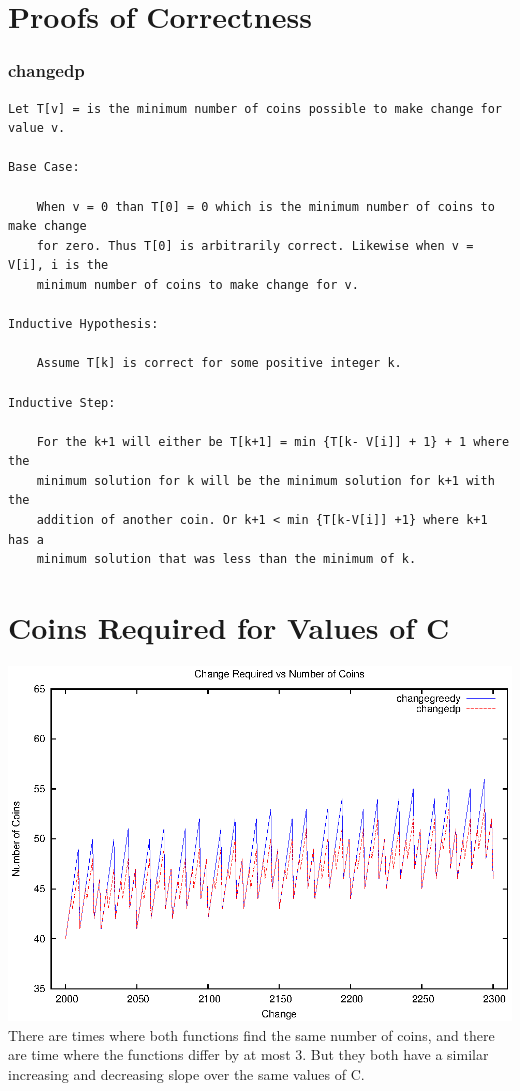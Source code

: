 \documentclass[letterpaper,10pt,titlepage]{article}
\begin{document}
\section{Proofs of Correctness}
\subsubsection{changedp}
\begin{verbatim}
Let T[v] = is the minimum number of coins possible to make change for value v.

Base Case: 

    When v = 0 than T[0] = 0 which is the minimum number of coins to make change 
    for zero. Thus T[0] is arbitrarily correct. Likewise when v = V[i], i is the
    minimum number of coins to make change for v.

Inductive Hypothesis: 

    Assume T[k] is correct for some positive integer k. 

Inductive Step:

    For the k+1 will either be T[k+1] = min {T[k- V[i]] + 1} + 1 where the
    minimum solution for k will be the minimum solution for k+1 with the
    addition of another coin. Or k+1 < min {T[k-V[i]] +1} where k+1 has a
    minimum solution that was less than the minimum of k.
\end{verbatim}

\section{Coins Required for Values of C}

\includegraphics[width=\textwidth]{graph.eps}
There are times where both functions find the same number of coins, and there are time where the functions differ by at most 3. But they both have a similar increasing and decreasing slope over the same values of C.
\end{document}
